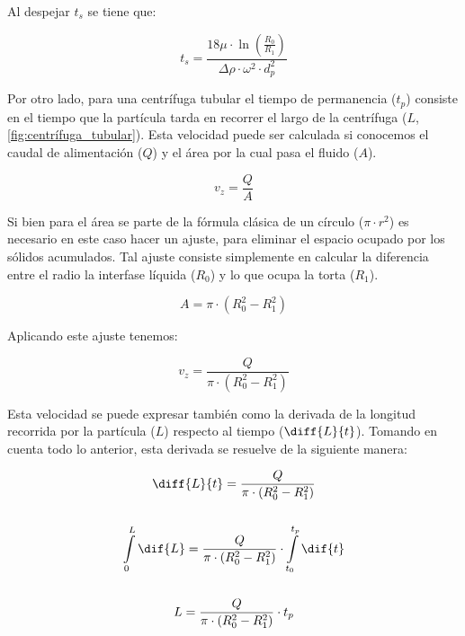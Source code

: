 \documentclass{AsignaturaResumen}
\begin{document}
Al despejar $t_{s}$ se tiene que:\footnotemark

\begin{equation}\label{eq:tiempo_de_sedimentacion_centrifuga_tubular}
    t_{s} = \frac{18\mu\cdot\ln\left(\frac{R_{0}}{R_{1}}\right)}{\Delta\rho\cdot\omega^{2}\cdot d_{p}^{2}}
\end{equation}


Por otro lado, para una centrífuga tubular el tiempo de permanencia ($t_{p}$) consiste en el tiempo que la partícula tarda en recorrer el largo de la centrífuga ($L$, \autoref{fig:centrífuga_tubular}). Esta velocidad puede ser calculada si conocemos el caudal de alimentación ($Q$) y el área por la cual pasa el fluido ($A$). 

\begin{equation*}
    v_{z} = \frac{Q}{A}
\end{equation*}

Si bien para el área se parte de la fórmula clásica de un círculo ($\pi \cdot r^{2}$) es necesario en este caso hacer un ajuste, para eliminar el espacio ocupado por los sólidos acumulados. Tal ajuste consiste simplemente en calcular la diferencia entre el radio la interfase líquida ($R_{0}$) y lo que ocupa la torta ($R_{1}$).

\begin{equation*}
    A = \pi \cdot (R_{0}^{2} - R_{1}^{2})
\end{equation*}

Aplicando este ajuste tenemos:  

\begin{equation}\label{eq:velocidad_de_permanencia_centrifuga_tubular}
    v_{z} = \frac{Q}{\pi\cdot(R_{0}^{2} - R_{1}^{2})}
\end{equation}

Esta velocidad se puede expresar también como la derivada de la longitud recorrida por la partícula ($L$) respecto al tiempo ($\diff{L}{t}$). Tomando en cuenta todo lo anterior, esta derivada se resuelve de la siguiente manera:

\begin{gather*}
    \diff{L}{t} = \frac{Q}{\pi\cdot(R_{0}^{2} - R_{1}^{2})}
    \\\\
    \int\limits_{0}^{L}{\dif{L}} = \frac{Q}{\pi\cdot(R_{0}^{2} - R_{1}^{2})} \cdot \int\limits_{t_0}^{t_{p}}{\dif{t}}
    \\\\
    L = \frac{Q}{\pi \cdot (R_{0}^{2} - R_{1}^{2})} \cdot t_{p}
\end{gather*}
\end{document}
